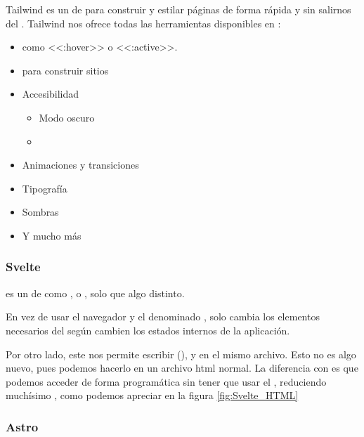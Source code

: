 Tailwind es un  de  para construir y estilar páginas de forma rápida y sin salirnos del . Tailwind nos ofrece todas las herramientas disponibles en :
\begin{itemize}
  \item {} como <<:hover>> o <<:active>>.
  \item {} para construir sitios 
  \item Accesibilidad
        \begin{itemize}
          \item Modo oscuro
          \item {}
        \end{itemize}
  \item Animaciones y transiciones
  \item Tipografía
  \item Sombras
  \item Y mucho más
\end{itemize}

\subsubsection{Svelte}

 es un  de  como ,  o , solo que algo distinto.

En vez de usar el navegador y el denominado  ,  solo cambia los elementos necesarios del  según cambien los estados internos de la aplicación.

Por otro lado, este  nos permite escribir  (),  y  en el mismo archivo. Esto no es algo nuevo, pues podemos hacerlo en un archivo html normal. La diferencia con  es que podemos acceder de forma programática sin tener que usar el , reduciendo muchísimo , como podemos apreciar en la figura \ref{fig:Svelte_HTML}


\subsubsection{Astro}

